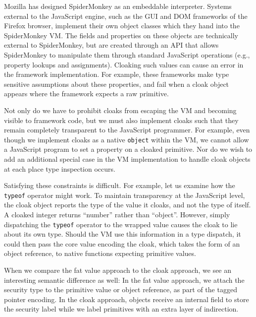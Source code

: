 \documentclass[11pt,onecolumn]{article}
\newcommand{\code}[1]{\texttt{#1}}
\begin{document}
Mozilla has designed SpiderMonkey as an embeddable interpreter.
Systems external to the JavaScript engine, such as the GUI and DOM frameworks of the Firefox browser, implement their own object classes which they hand into the SpiderMonkey VM.
The fields and properties on these objects are technically external to SpiderMonkey, but are created through an API that allows SpiderMonkey to manipulate them through standard JavaScript operations (e.g., property lookups and assignments).
Cloaking such values can cause an error in the framework implementation.
For example, these frameworks make type sensitive assumptions about these properties, and fail when a cloak object appears where the framework expects a raw primitive.

Not only do we have to prohibit cloaks from escaping the VM and becoming visible to framework code, but we must also implement cloaks such that they remain completely transparent to the JavaScript programmer.
For example, even though we implement cloaks as a native \texttt{object} within the VM, we cannot allow a JavaScript program to set a property on a cloaked primitive.
Nor do we wish to add an additional special case in the VM implementation to handle cloak objects at each place type inspection occurs.

Satisfying these constraints is difficult.
For example, let us examine how the \code{typeof} operator might work.
To maintain transparency at the JavaScript level, the cloak object reports the type of the value it cloaks, and not the type of itself.
A cloaked integer returns ``number'' rather than ``object''.
However, simply dispatching the \code{typeof} operator to the wrapped value causes the cloak to lie about its own type.
Should the VM use this information in a type dispatch, it could then pass the core value encoding the cloak, which takes the form of an object reference, to native functions expecting primitive values.

When we compare the fat value approach to the cloak approach, we see an interesting semantic difference as well:
In the fat value approach, we attach the security type to the primitive value or object reference, as part of the tagged pointer encoding.
In the cloak approach, objects receive an internal field to store the security label while we label primitives with an extra layer of indirection.
\end{document}

